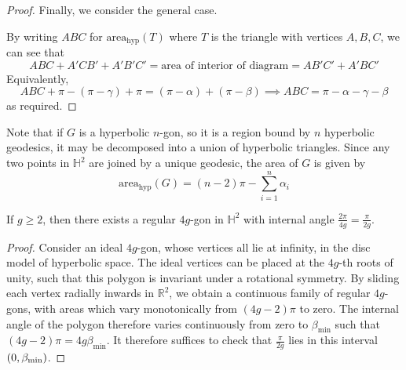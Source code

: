 \begin{proof}
	Finally, we consider the general case.
	\begin{center}
	\end{center}
	By writing \( ABC \) for \( \mathrm{area}_{\text{hyp}}(T) \) where \( T \) is the triangle with vertices \( A, B, C \), we can see that
	\[
		ABC + A'CB' + A'B'C' =  \text{area of interior of diagram} = AB'C' + A'BC'
	\]
	Equivalently,
	\[
		ABC + \pi - (\pi - \gamma) + \pi = (\pi - \alpha) + (\pi - \beta) \implies ABC = \pi - \alpha - \gamma - \beta
	\]
	as required.
\end{proof}
Note that if \( G \) is a hyperbolic \( n \)-gon, so it is a region bound by \( n \) hyperbolic geodesics, it may be decomposed into a union of hyperbolic triangles.
Since any two points in \( \mathbb H^2 \) are joined by a unique geodesic, the area of \( G \) is given by
\[
	\mathrm{area}_{\text{hyp}}(G) = (n-2)\pi - \sum_{i=1}^n \alpha_i
\]
\begin{lemma}
	If \( g \geq 2 \), then there exists a regular \( 4g \)-gon in \( \mathbb H^2 \) with internal angle \( \frac{2\pi}{4g} = \frac{\pi}{2g} \).
\end{lemma}
\begin{proof}
	Consider an ideal \( 4g \)-gon, whose vertices all lie at infinity, in the disc model of hyperbolic space.
	The ideal vertices can be placed at the \( 4g \)-th roots of unity, such that this polygon is invariant under a rotational symmetry.
	By sliding each vertex radially inwards in \( \mathbb R^2 \), we obtain a continuous family of regular \( 4g \)-gons, with areas which vary monotonically from \( (4g-2)\pi \) to zero.
	The internal angle of the polygon therefore varies continuously from zero to \( \beta_{\min} \) such that \( (4g-2)\pi = 4g \beta_{\min} \).
	It therefore suffices to check that \( \frac{\pi}{2g} \) lies in this interval \( \qty(0,\beta_{\min}) \).
\end{proof}

